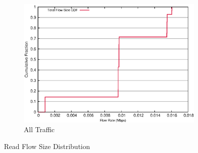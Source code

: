 \begin{figure}[!ht]
\begin{subfigure}[b]{.75\linewidth}
	\includegraphics[width=.99\textwidth]{figures/4read/flow_size.eps}
	\caption{All Traffic}\label{fig:read_size:all}
   \end{subfigure}%
\caption{Read Flow Size Distribution}
\end{figure}

